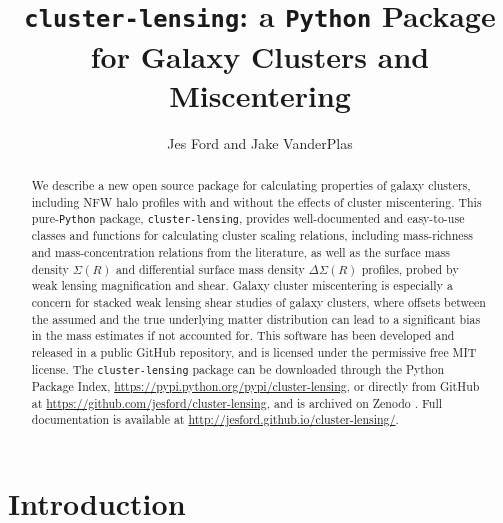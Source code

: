 \documentclass[twocolumn]{aastex6}
\newcommand{\code}{\lstinline[style=codeintext]}
\newcommand{\hcode}{\large\normalfont\texttt} %
\begin{document}
\title{\MakeLowercase{\hcode{cluster-lensing}}: a \hcode{P}\MakeLowercase{\hcode{ython}} Package for Galaxy Clusters and Miscentering}

\author{Jes Ford and Jake VanderPlas}


\shorttitle{\hcode{cluster-lensing}}


\begin{abstract}
We describe a new open source package for calculating properties of galaxy clusters, including NFW halo profiles with and without the effects of cluster miscentering. This pure-\code{Python} package, \code{cluster-lensing}, provides well-documented and easy-to-use classes and functions for calculating cluster scaling relations, including mass-richness and mass-concentration relations from the literature, as well as the surface mass density $\Sigma(R)$ and differential surface mass density $\Delta\Sigma(R)$ profiles, probed by weak lensing magnification and shear. Galaxy cluster miscentering is especially a concern for stacked weak lensing shear studies of galaxy clusters, where offsets between the assumed and the true underlying matter distribution can lead to a significant bias in the mass estimates if not accounted for. This software has been developed and released in a public GitHub repository, and is licensed under the permissive free MIT license. The \code{cluster-lensing} package can be downloaded through the Python Package Index, \url{https://pypi.python.org/pypi/cluster-lensing}, or directly from GitHub at \url{https://github.com/jesford/cluster-lensing}, and is archived on Zenodo \citep{clusterlensing}. Full documentation is available at \url{http://jesford.github.io/cluster-lensing/}.
\end{abstract}


\setcounter{section}{0}
\setcounter{subsection}{0}
\setcounter{subsubsection}{0}


\section{Introduction}
\label{intro}
\end{document}
